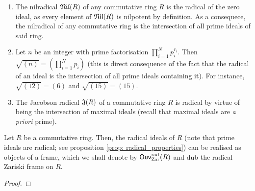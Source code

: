                 \begin{example}
                    \noindent
                    \begin{enumerate}
                        \item The nilradical $\mathfrak{Nil}(R)$ of any commutative ring $R$ is the radical of the zero ideal, as every element of $\mathfrak{Nil}(R)$ is nilpotent by definition. As a consequece, the nilradical of any commutative ring is the intersection of all prime ideals of said ring.
                        \item Let $n$ be an integer with prime factorisation $\prod_{i = 1}^N p_i^{r_i}$. Then $\sqrt{(n)} = \left(\prod_{i = 1}^N p_i\right)$ (this is direct consequence of the fact that the radical of an ideal is the intersection of all prime ideals containing it). For instance, $\sqrt{(12)} = (6)$ and $\sqrt{(15)} = (15)$. 
                        \item The Jacobson radical $\mathfrak{J}(R)$ of a commutative ring $R$ is radical by virtue of being the intersection of maximal ideals (recall that maximal ideals are \textit{a priori} prime).
                    \end{enumerate}
                \end{example}
                
                \begin{proposition} \label{prop: radical_frame}
                    Let $R$ be a commutative ring. Then, the radical ideals of $R$ (note that prime ideals are radical; see proposition \ref{prop: radical_properties}) can be realised as objects of a frame, which we shall denote by $\mathsf{Ouv}_{\mathrm{Zar}}^{\mathrm{rad}}(R)$ and dub the radical Zariski frame on $R$.
                \end{proposition}
                    \begin{proof}
                        
                    \end{proof}
                
